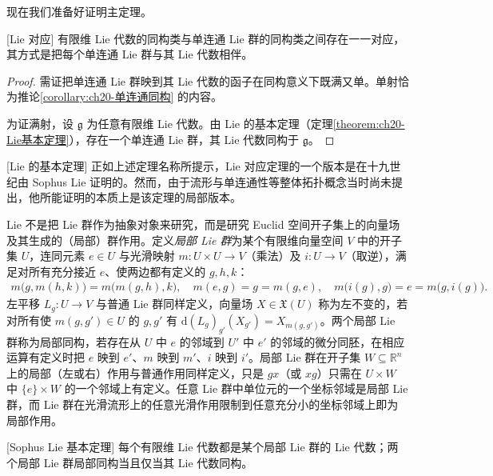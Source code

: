 \documentclass[../../main.tex]{subfiles}
\begin{document}
现在我们准备好证明主定理。

\begin{theorem}{[Lie 对应]}\label{theorem:ch20-Lie对应}
有限维 Lie 代数的同构类与单连通 Lie 群的同构类之间存在一一对应，其方式是把每个单连通 Lie 群与其 Lie 代数相伴。
\end{theorem}

\begin{proof}
需证把单连通 Lie 群映到其 Lie 代数的函子在同构意义下既满又单。单射恰为推论\cref{corollary:ch20-单连通同构} 的内容。

为证满射，设 $\mathfrak g$ 为任意有限维 Lie 代数。由 Lie 的基本定理（定理\cref{theorem:ch20-Lie基本定理}），存在一个单连通 Lie 群，其 Lie 代数同构于 $\mathfrak g$。
\end{proof}

\begin{remark}{[Lie 的基本定理]}\label{remark:ch20-Lie基本定理历史}
正如上述定理名称所提示，Lie 对应定理的一个版本是在十九世纪由 Sophus Lie 证明的。然而，由于流形与单连通性等整体拓扑概念当时尚未提出，他所能证明的本质上是该定理的局部版本。

Lie 不是把 Lie 群作为抽象对象来研究，而是研究 Euclid 空间开子集上的向量场及其生成的（局部）群作用。定义\emph{局部 Lie 群}为某个有限维向量空间 $V$ 中的开子集 $U$，连同元素 $e\in U$ 与光滑映射 $m\colon U\times U\to V$（乘法）及 $i\colon U\to V$（取逆），满足对所有充分接近 $e$、使两边都有定义的 $g,h,k$：
\begin{align*}
m\bigl(g,m(h,k)\bigr)=m\bigl(m(g,h),k\bigr),\quad m(e,g)=g=m(g,e),\quad m\bigl(i(g),g\bigr)=e=m\bigl(g,i(g)\bigr).
\end{align*}
左平移 $L_g\colon U\to V$ 与普通 Lie 群同样定义，向量场 $X\in\mathfrak X(U)$ 称为左不变的，若对所有使 $m(g,g')\in U$ 的 $g,g'$ 有 $\mathrm{d}(L_g)_{g'}(X_{g'})=X_{m(g,g')}$。两个局部 Lie 群称为局部同构，若存在从 $U$ 中 $e$ 的邻域到 $U'$ 中 $e'$ 的邻域的微分同胚，在相应运算有定义时把 $e$ 映到 $e'$、$m$ 映到 $m'$、$i$ 映到 $i'$。局部 Lie 群在开子集 $W\subseteq\mathbb{R}^n$ 上的局部（左或右）作用与普通作用同样定义，只是 $gx$（或 $xg$）只需在 $U\times W$ 中 $\{e\}\times W$ 的一个邻域上有定义。任意 Lie 群中单位元的一个坐标邻域是局部 Lie 群，而 Lie 群在光滑流形上的任意光滑作用限制到任意充分小的坐标邻域上即为局部作用。
\end{remark}

\begin{theorem}{[Sophus Lie 基本定理]}\label{theorem:ch20-Lie基本定理}
每个有限维 Lie 代数都是某个局部 Lie 群的 Lie 代数；两个局部 Lie 群局部同构当且仅当其 Lie 代数同构。
\end{theorem}
\end{document}
